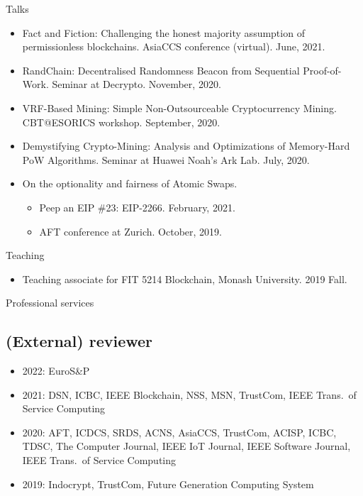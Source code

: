\documentclass{resume} %
\begin{document}
\begin{rSection}{Talks}
    \begin{itemize}
        \item Fact and Fiction: Challenging the honest majority assumption of permissionless blockchains. AsiaCCS conference (virtual). June, 2021.
        \item RandChain: Decentralised Randomness Beacon from Sequential Proof-of-Work. Seminar at Decrypto. November, 2020.
        \item VRF-Based Mining: Simple Non-Outsourceable Cryptocurrency Mining. CBT@ESORICS workshop. September, 2020.
        \item Demystifying Crypto-Mining: Analysis and Optimizations of Memory-Hard PoW Algorithms. Seminar at Huawei Noah's Ark Lab. July, 2020.
        \item On the optionality and fairness of Atomic Swaps.
              \begin{itemize}
                  \item Peep an EIP \#23: EIP-2266. February, 2021.
                  \item AFT conference at Zurich. October, 2019.
              \end{itemize}
    \end{itemize}
\end{rSection}


\begin{rSection}{Teaching}
    \begin{itemize}
        \item Teaching associate for FIT 5214 Blockchain, Monash University. 2019 Fall.
    \end{itemize}
\end{rSection}


\begin{rSection}{Professional services}
    \subsection*{(External) reviewer}
    \begin{itemize}
        \item 2022: EuroS\&P
        \item 2021: DSN, ICBC, IEEE Blockchain, NSS, MSN, TrustCom, IEEE Trans.\ of Service Computing
        \item 2020: AFT, ICDCS, SRDS, ACNS, AsiaCCS, TrustCom, ACISP, ICBC, TDSC, The Computer Journal, IEEE IoT Journal, IEEE Software Journal, IEEE Trans.\ of Service Computing
        \item 2019: Indocrypt, TrustCom, Future Generation Computing System
    \end{itemize}
\end{rSection}
\end{document}
